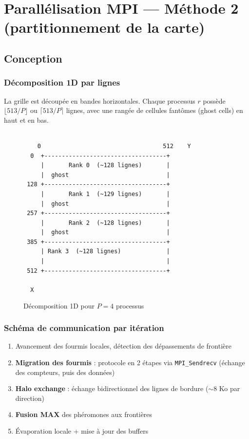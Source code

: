 \documentclass[11pt,a4paper]{article}
\begin{document}
\newpage
\section{Parallélisation MPI --- Méthode 2 (partitionnement de la carte)}

\subsection{Conception}

\subsubsection{Décomposition 1D par lignes}

La grille est découpée en bandes horizontales. Chaque processus $r$ possède $\lfloor 513/P \rfloor$ ou $\lceil 513/P \rceil$ lignes, avec une rangée de cellules fantômes (ghost cells) en haut et en bas.

\begin{figure}[H]
\centering
\begin{verbatim}
             
    0                                   512    Y
  0  +-----------------------------------+
     |       Rank 0  (~128 lignes)       |
     |  ghost                            |
 128 +-----------------------------------+
     |       Rank 1  (~129 lignes)       |
     |  ghost                            |
 257 +-----------------------------------+
     |       Rank 2  (~128 lignes)       |
     |  ghost                            |
 385 +-----------------------------------+
     | Rank 3  (~128 lignes)             |
     |                                   |
 512 +-----------------------------------+

  X
\end{verbatim}
\caption*{Décomposition 1D pour $P=4$ processus}
\end{figure}

\subsubsection{Schéma de communication par itération}

\begin{enumerate}[nosep]
    \item Avancement des fourmis locales, détection des dépassements de frontière
    \item \textbf{Migration des fourmis} : protocole en 2 étapes via \texttt{MPI\_Sendrecv} (échange des compteurs, puis des données)
    \item \textbf{Halo exchange} : échange bidirectionnel des lignes de bordure ($\sim$8 Ko par direction)
    \item \textbf{Fusion MAX} des phéromones aux frontières
    \item Évaporation locale + mise à jour des buffers
\end{enumerate}
\end{document}
